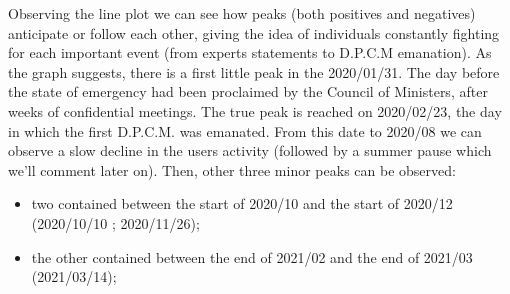 \documentclass[sigchi]{acmart}
\begin{document}
Observing the line plot we can see how peaks (both positives and negatives) anticipate or follow each other, giving the idea of individuals constantly fighting for each important event (from experts statements to D.P.C.M emanation). As the graph suggests, there is a first little peak in the 2020/01/31. The day before the state of emergency had been proclaimed by the Council of Ministers, after weeks of confidential meetings\cite{regioni}. The true peak is reached on 2020/02/23, the day in which the first D.P.C.M. was emanated\cite{dpcm}. From this date to 2020/08 we can observe a slow decline in the users activity (followed by a summer pause which we’ll comment later on). Then, other three minor peaks can be observed:
\begin{itemize}
    \item 	two contained between the start of 2020/10 and the start of 2020/12 %
    (2020/10/10 ; 2020/11/26);
    \item 	the other contained between the end of 2021/02 and the end of 2021/03 %
    (2021/03/14);
\end{itemize}
\end{document}
